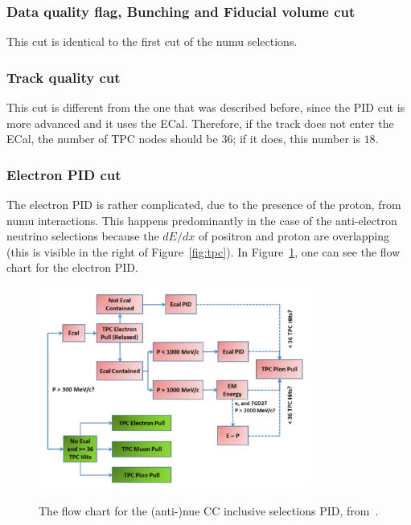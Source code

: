 \subsubsection{Data quality flag, Bunching and Fiducial volume cut}
This cut is identical to the first cut of the \Gls{numu} selections.

\subsubsection{Track quality cut}
This cut is different from the one that was described before, since
the \Gls{PID} cut is more advanced and it uses the
\Gls{ECal}. Therefore, if the track does not enter the \Gls{ECal}, the
number of \Gls{TPC} nodes should be $36$; if it does, this number is
$18$.

\subsubsection{Electron \Gls{PID} cut}
\label{subsubsec:electronpid}
The electron \Gls{PID} is rather complicated, due to the presence of
the proton, from \Gls{numu} interactions. This happens predominantly
in the case of the anti-electron neutrino selections because the
$dE/dx$ of positron and proton are overlapping (this is visible in the
right of Figure~\ref{fig:tpc}). In Figure~\ref{fig:NuEPID}, one can
see the flow chart for the electron \Gls{PID}.

\begin{figure}[ht]
  \center
  \includegraphics[width=0.8\textwidth]{images/BANFF/NuEPID.pdf} \\
  \caption[The flow chart for the $\nu_e$ PID]{The flow chart for the
    (anti-)\Gls{nue} \Gls{CC} inclusive selections \gls{PID},
    from~\cite{TN282}.}
  \label{fig:NuEPID}
\end{figure}

